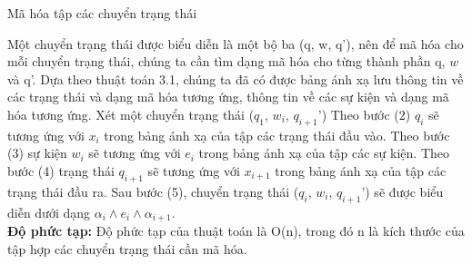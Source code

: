 \documentclass[a4paper,13pt,oneside,openany]{book}
\newenvironment{megaalgorithm}[1][htb]
{\renewcommand{\algorithmcfname}{Thuật toán}%
	\begin{algorithm}[#1]%
}{\end{algorithm}}
\begin{document}
\begin{flushleft}
\begin{megaalgorithm}[H]
			\caption{Mã hóa tập các chuyển trạng thái}
		\end{megaalgorithm}
		Một chuyển trạng thái được biểu diễn là một bộ ba (q, w, q'), nên để mã hóa cho mỗi chuyển trạng thái, chúng ta cần tìm dạng mã hóa cho từng thành phần q, $w$ và q'. Dựa theo thuật toán 3.1, chúng ta đã có được bảng ánh xạ lưu thông tin về các trạng thái và dạng mã hóa tương ứng, thông tin về các sự kiện và dạng mã hóa tương ứng. Xét một chuyển trạng thái ($q_1$, $w_i$, $q_{i+1}$') Theo bước (2) $q_{i}$ sẽ tương ứng với $x_i$ trong bảng ánh xạ của tập các trạng thái đầu vào. Theo bước (3) sự kiện $w_i$ sẽ tương ứng với $e_i$ trong bảng ánh xạ của tập các sự kiện. Theo bước (4) trạng thái $q_{i+1}$ sẽ tương ứng với $x_{i+1}$ trong bảng ánh xạ của tập các trạng thái đầu ra. Sau bước (5), chuyển trạng thái ($q_i$, $w_i$, $q_{i+1}$') sẽ được biểu diễn dưới dạng $\alpha_{i} \land e_i \land \alpha_{i+1}$.\\
		\textbf{Độ phức tạp:} Độ phức tạp của thuật toán là O(n), trong đó n là kích thước của tập hợp các chuyển trạng thái cần mã hóa.

\end{flushleft}
\end{document}
